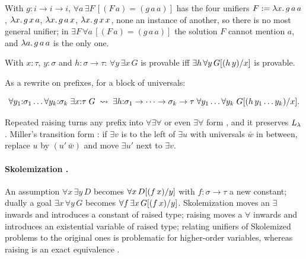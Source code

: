 \begin{example}\label{ex:rules-prefix}
With $g:i\to i\to i$, $\forall a\,\exists F\,[(F\,a)=(g\,a\,a)]$ has the four unifiers $F:=\lambda x.\,g\,a\,a$, $\lambda x.\,g\,x\,a$, $\lambda x.\,g\,a\,x$, $\lambda x.\,g\,x\,x$, none an instance of another, so there is no most general unifier; in $\exists F\,\forall a\,[(F\,a)=(g\,a\,a)]$ the solution $F$ cannot mention $a$, and $\lambda a.\,g\,a\,a$ is the only one.
\end{example}

\begin{proposition}\label{prop:rules-raising}
With $x:\tau$, $y:\sigma$ and $h:\sigma\to\tau$: $\forall y\,\exists x\,G$ is provable iff $\exists h\,\forall y\,G[(h\,y)/x]$ is provable.
\end{proposition}
As a rewrite on prefixes, for a block of universals:
\begin{fullwidth}
\[
\forall y_1{:}\sigma_1\dots\forall y_k{:}\sigma_k\;\exists x{:}\tau\;G \;\rightsquigarrow\; \exists h{:}\sigma_1\to\dots\to\sigma_k\to\tau\;\forall y_1\dots\forall y_k\;G[(h\,y_1\dots y_k)/x].
\]
\end{fullwidth}
Repeated raising turns any prefix into $\forall\exists\forall$ or even $\exists\forall$ form , and it preserves $L_\lambda$ .
Miller's transition form \cite[p.\,14--16]{Miller1991}: if $\exists v$ is to the left of $\exists u$ with universals $\bar w$ in between, replace $u$ by $(u'\,\bar w)$ and move $\exists u'$ next to $\exists v$.

\paragraph{Skolemization .} An assumption $\forall x\,\allowbreak\exists y\,D$ becomes $\forall x\,\allowbreak D[(f\,x)/y]$ with $f:\sigma\to\tau$ a new constant; dually a goal $\exists x\,\allowbreak\forall y\,G$ becomes $\forall f\,\allowbreak\exists x\,\allowbreak G[(f\,x)/y]$.
Skolemization moves an $\exists$ inwards and introduces a constant of raised type; raising moves a $\forall$ inwards and introduces an existential variable of raised type; relating unifiers of Skolemized problems to the original ones is problematic for higher-order variables, whereas raising is an exact equivalence .

